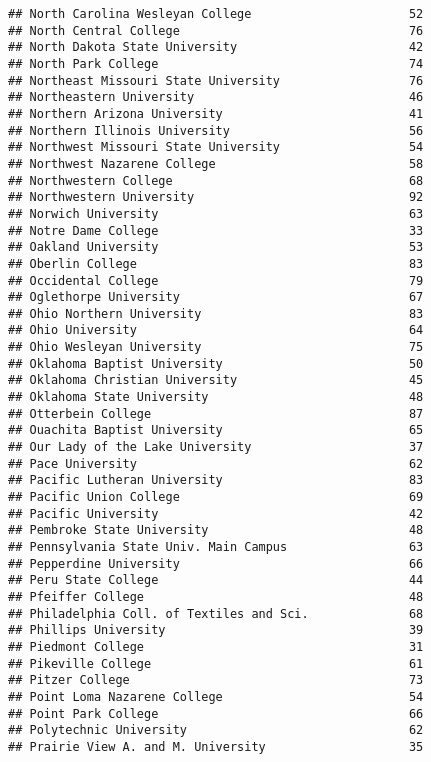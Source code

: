 \documentclass[
]{article}
\begin{document}
\begin{verbatim}
## North Carolina Wesleyan College                      52
## North Central College                                76
## North Dakota State University                        42
## North Park College                                   74
## Northeast Missouri State University                  76
## Northeastern University                              46
## Northern Arizona University                          41
## Northern Illinois University                         56
## Northwest Missouri State University                  54
## Northwest Nazarene College                           58
## Northwestern College                                 68
## Northwestern University                              92
## Norwich University                                   63
## Notre Dame College                                   33
## Oakland University                                   53
## Oberlin College                                      83
## Occidental College                                   79
## Oglethorpe University                                67
## Ohio Northern University                             83
## Ohio University                                      64
## Ohio Wesleyan University                             75
## Oklahoma Baptist University                          50
## Oklahoma Christian University                        45
## Oklahoma State University                            48
## Otterbein College                                    87
## Ouachita Baptist University                          65
## Our Lady of the Lake University                      37
## Pace University                                      62
## Pacific Lutheran University                          83
## Pacific Union College                                69
## Pacific University                                   42
## Pembroke State University                            48
## Pennsylvania State Univ. Main Campus                 63
## Pepperdine University                                66
## Peru State College                                   44
## Pfeiffer College                                     48
## Philadelphia Coll. of Textiles and Sci.              68
## Phillips University                                  39
## Piedmont College                                     31
## Pikeville College                                    61
## Pitzer College                                       73
## Point Loma Nazarene College                          54
## Point Park College                                   66
## Polytechnic University                               62
## Prairie View A. and M. University                    35

\end{verbatim}
\end{document}
